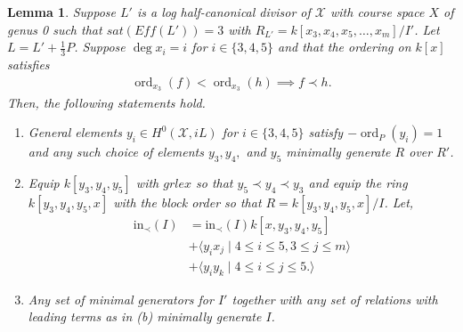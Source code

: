 \documentclass{amsart}
\theoremstyle{plain}
\newtheorem{lem}[thm]{Lemma}
\theoremstyle{definition}
\theoremstyle{remark}
\numberwithin{equation}{section}
\newcommand \sx{\mathscr X}
\DeclareMathOperator{\ord}{ord}
\newcommand \halfcan{L}
\newcommand \initial{\text{in}}
\begin{document}
\begin{lem}
\label{lem:sat-two-induction-genus-0}
Suppose $L'$ is a log half-canonical divisor of $\sx$ with course space $X$ of genus 0 such that $sat(Eff(\halfcan')) = 3$ with $R_{\halfcan'} = k[x_3, x_4
, x_5,\ldots, x_m]/I'$.  Let $L = L' + \frac{1}{
3}P$.  Suppose $\deg x_i = i$ for $i \in \{3, 4, 5\}$ and that the ordering on $k[x]$ satisfies
\begin{align*}
	\ord_{x_3}(f) < \ord_{x_3}(h) \implies f \prec h.
\end{align*}
Then, the following statements hold.

\begin{enumerate}
	\item[(a)] General elements  $y_i \in H^0(\sx,iL)$ for $i \in \{3,
		4,5\}$ satisfy $-\ord_P(y_i) = 1$ and any such choice of elements $y
		_3,y_4,$ and $y_5$ minimally generate $R$ over $R'$.
	\item[(b)] Equip $k[y_3, y_4, y_5]$ with $grlex$ so that $y_5 \prec 
		y_4 \prec y_3$
		and equip the ring $k[y_3, y_4, y_5, x]$ with the block 
		order so that $R = k[y_3, y_4, y_5, x]/I$. Let,
		\begin{align*}
			\initial_\prec(I) &= \initial_\prec(I)k[x,y_3,y_4,y_5] \\
			&+\langle y_i x_j \mid 4 \leq i \leq 5, 3 \leq j \leq m\rangle \\
			&+\langle y_iy_k \mid 4 \leq i \leq j \leq 5.\rangle 
		\end{align*}
	\item[(c)] Any set of minimal generators for $I'$ together with 
		any set of relations with leading terms as in (b) minimally 
		generate $I$.
\end{enumerate}
\end{lem}
\end{document}
